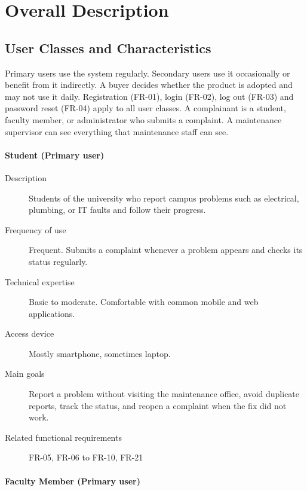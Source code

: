 \chapter{Overall Description}
\label{Overall Description}

\section{User Classes and Characteristics}
Primary users use the system regularly. Secondary users use it occasionally or benefit from it indirectly. A buyer decides whether the product is adopted and may not use it daily. Registration (FR-01), login (FR-02), log out (FR-03) and password reset (FR-04) apply to all user classes. A complainant is a student, faculty member, or administrator who submits a complaint. A maintenance supervisor can see everything that maintenance staff can see.

\subsubsection*{Student (Primary user)}

\begin{description}
  \item[Description] Students of the university who report campus problems such as electrical, plumbing, or IT faults and follow their progress.
  \item[Frequency of use] Frequent. Submits a complaint whenever a problem appears and checks its status regularly.
  \item[Technical expertise] Basic to moderate. Comfortable with common mobile and web applications.
  \item[Access device] Mostly smartphone, sometimes laptop.
  \item[Main goals] Report a problem without visiting the maintenance office, avoid duplicate reports, track the status, and reopen a complaint when the fix did not work.
  \item[Related functional requirements] FR-05, FR-06 to FR-10, FR-21
\end{description}

\subsubsection*{Faculty Member (Primary user)}

